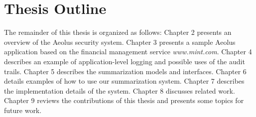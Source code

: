



\section{Thesis Outline}

The remainder of this thesis is organized as follows: Chapter 2 presents an overview of the Aeolus security system. Chapter 3 presents a sample Aeolus application based on the financial management service \emph{www.mint.com}. Chapter 4 describes an example of application-level logging and possible uses of the audit trails. Chapter 5 describes the summarization models and interfaces. Chapter 6 details examples of how to use our summarization system. Chapter 7 describes the implementation details of the system. Chapter 8 discusses related work. Chapter 9 reviews the contributions of this thesis and presents some topics for future work.
